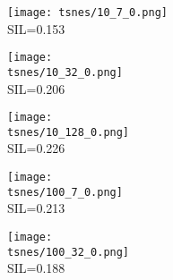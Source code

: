 \documentclass{article}
\begin{document}
\begin{figure}[ht]
\begin{center}
\begin{subfigure}[b]{\linewidth}
        \begin{subfigure}[b]{.49\linewidth}
        \centering
        \begin{subfigure}[b]{.25\linewidth}
        \centering
        
        \texttt{[image: tsnes/10\_7\_0.png]}
        SIL=0.153
        \end{subfigure}
        \begin{subfigure}[b]{.25\linewidth}
        \centering
        
        \texttt{[image: tsnes/10\_32\_0.png]}
        SIL=0.206
        \end{subfigure}
        \begin{subfigure}[b]{.25\linewidth}
        \centering
        
        \texttt{[image: tsnes/10\_128\_0.png]}
        SIL=0.226
        \end{subfigure}
\caption{}
        \label{figa0b10}
        \end{subfigure}
        \hfill
        \begin{subfigure}[b]{.49\linewidth}
        \begin{subfigure}[b]{.25\linewidth}
        \centering
        
        \texttt{[image: tsnes/100\_7\_0.png]}
        SIL=0.213
        \end{subfigure}
        \begin{subfigure}[b]{.25\linewidth}
        \centering
        
        \texttt{[image: tsnes/100\_32\_0.png]}
        SIL=0.188
        \end{subfigure}
        \begin{subfigure}[b]{.25\linewidth}
        \centering
        

\end{subfigure}
\end{subfigure}
\end{subfigure}
\end{center}
\end{figure}
\end{document}
